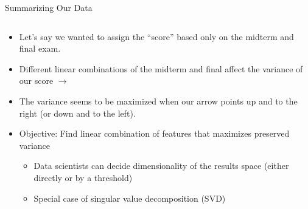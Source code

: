 \documentclass[aspectratio=169]{../latex_main/tntbeamer}  %
\begin{document}
	
	\begin{frame}{Summarizing Our Data}
	    \begin{columns}
	        \begin{column}{.5\textwidth}
	        
	       \vspace{-2em}
	        \begin{itemize}
	            \item Let’s say we wanted to assign the “score” based only on the midterm and final exam.
	            \item Different linear combinations of the midterm and final affect the variance of our score $\rightarrow$
	            \item The variance seems to be maximized when our arrow points up and to the right (or down and to the left).
                \item \alert{Objective:} Find linear combination of features that maximizes preserved variance	           
                \begin{itemize}
                    \item Data scientists can decide dimensionality of the results space (either directly or by a threshold)
                    \item Special case of singular value decomposition (SVD)
                \end{itemize}
	        \end{itemize}
	               
	        \end{column}
	        

\end{columns}
\end{frame}
\end{document}
